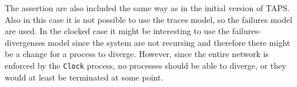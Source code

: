 The assertion are also included the same way as in the initial version of TAPS. Also in this case it is not possible to use the traces model, so the failures model are used. In the clocked case it might be interesting to use the failures-divergenses model since the system are not recursing and therefore there might be a change for a process to diverge. However, since the entire network is enforced by the \texttt{Clock} process, no processes should be able to diverge, or they would at least be terminated at some point.









